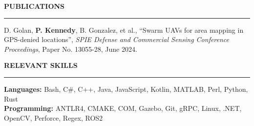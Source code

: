 \documentclass[10pt, letterpaper]{article}
\newcommand{\ressection}[1]{%
    \vspace{10pt}%
    {\large\bfseries\MakeUppercase{#1}}%
    \vspace{2pt}%
    \hrule%
    \vspace{6pt}%
}
\newcommand{\resumeentry}[4]{%
    \textbf{#1}\hfill #2\\%
    \textit{#3}\hfill #4%
}
\begin{document}

\ressection{Publications}
D. Golan, \textbf{P. Kennedy}, B. Gonzalez, et al., ``Swarm UAVs for area mapping in GPS-denied locations'', \textit{SPIE Defense and Commercial Sensing Conference Proceedings}, Paper No. 13055-28, June 2024.

\ressection{Relevant Skills}
\textbf{Languages:} Bash, C\#, C++, Java, JavaScript, Kotlin, MATLAB, Perl, Python, Rust\\[2pt]
\textbf{Programming:} ANTLR4, CMAKE, COM, Gazebo, Git, gRPC, Linux, .NET, OpenCV, Perforce, Regex, ROS2
\end{document}

